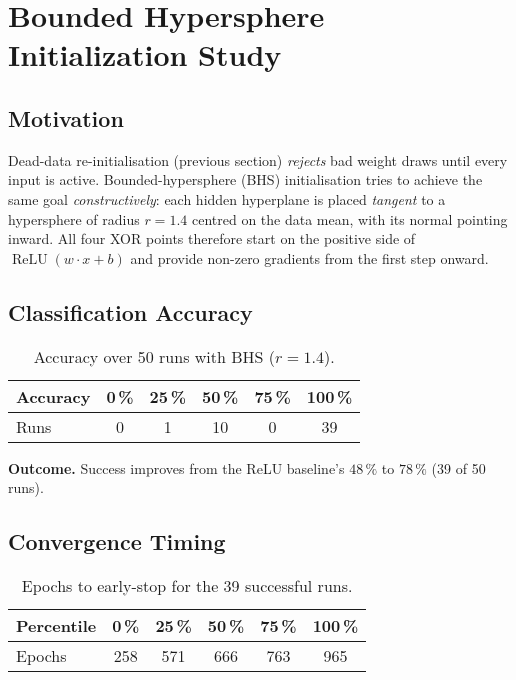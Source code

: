 \section{Bounded Hypersphere Initialization Study}
\label{sec:relu1-bounded-hypersphere}

\subsection*{Motivation}
Dead-data re-initialisation (previous section) \emph{rejects} bad weight
draws until every input is active.  
Bounded-hypersphere (BHS) initialisation tries to achieve the same goal
\emph{constructively}: each hidden hyperplane is placed
\emph{tangent} to a hypersphere of radius $r=1.4$
centred on the data mean, with its normal pointing inward.
All four XOR points therefore start on the positive side of
\(\operatorname{ReLU}(w\!\cdot\!x+b)\) and provide non-zero gradients
from the first step onward.

\subsection*{Classification Accuracy}

\begin{table}[h]
\centering
\caption{Accuracy over 50 runs with BHS ($r=1.4$).}
\label{tab:relu1-bhs-accuracy}
\begin{tabular}{lccccc}
\toprule
Accuracy & 0\,\% & 25\,\% & 50\,\% & 75\,\% & 100\,\% \\
\midrule
Runs & 0 & 1 & 10 & 0 & 39 \\
\bottomrule
\end{tabular}
\end{table}

\textbf{Outcome.}
Success improves from the ReLU baseline's $48\,\%$ to $78\,\%$ (39 of 50 runs).

\subsection*{Convergence Timing}

\begin{table}[h]
\centering
\caption{Epochs to early-stop for the 39 successful runs.}
\label{tab:relu1-bhs-epochs}
\begin{tabular}{lccccc}
\toprule
Percentile & 0\,\% & 25\,\% & 50\,\% & 75\,\% & 100\,\% \\
\midrule
Epochs & 258 & 571 & 666 & 763 & 965\\
\bottomrule
\end{tabular}
\end{table}

